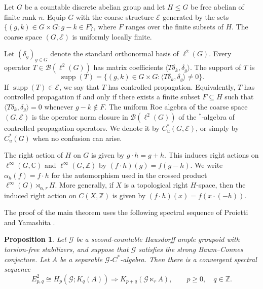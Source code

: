 \documentclass[pdflatex,sn-mathphys-num]{sn-jnl}%
\theoremstyle{plain}
\newtheorem{proposition}[theorem]{Proposition}
\theoremstyle{remark}
\theoremstyle{definition}
\numberwithin{equation}{section}
\begin{document}
Let \( G \) be a countable discrete abelian group and let \( H\leq G \) be free abelian of finite rank \( n \). Equip \( G \) with the coarse structure \( \mathcal E \) generated by the sets \( \{(g,k)\in G\times G:g-k\in F\} \), where \( F \) ranges over the finite subsets of \( H \). The coarse space \( (G,\mathcal E) \) is uniformly locally finite.

Let \( (\delta_g)_{g\in G} \) denote the standard orthonormal basis of \( \ell^2(G) \). Every operator \( T\in\mathcal B(\ell^2(G)) \) has matrix coefficients \( \langle T\delta_k,\delta_g\rangle \). The support of \( T \) is
\[
\operatorname{supp}(T)=\{(g,k)\in G\times G:\langle T\delta_k,\delta_g\rangle\neq0\}.
\]
If \( \operatorname{supp}(T)\in\mathcal E \), we say that \( T \) has controlled propagation. Equivalently, \( T \) has controlled propagation if and only if there exists a finite subset \( F\subseteq H \) such that \( \langle T\delta_k,\delta_g\rangle=0 \) whenever \( g-k\notin F \). The uniform Roe algebra of the coarse space \( (G,\mathcal E) \) is the operator norm closure in \( \mathcal B(\ell^2(G)) \) of the \( ^* \)-algebra of controlled propagation operators. We denote it by \( C_u^*(G,\mathcal E) \), or simply by \( C_u^*(G) \) when no confusion can arise.

The right action of \( H \) on \( G \) is given by \( g\cdot h=g+h \). This induces right actions on \( \ell^\infty(G,\mathbb C) \) and \( \ell^\infty(G,\mathbb Z) \) by \( (f\cdot h)(g)=f(g-h) \). We write \( \alpha_h(f)=f\cdot h \) for the automorphism used in the crossed product \( \ell^\infty(G)\rtimes_{\alpha,r}H \). More generally, if \( X \) is a topological right \( H \)-space, then the induced right action on \( C(X,\mathbb Z) \) is given by \( (f\cdot h)(x)=f(x\cdot(-h)) \).

The proof of the main theorem uses the following spectral sequence of Proietti and Yamashita \cite[Theorem~3.3]{proietti2022homology}.

\begin{proposition}
\label{prop:spectral-sequence}
Let \( \mathcal G \) be a second-countable Hausdorff ample groupoid with torsion-free stabilizers, and suppose that \( \mathcal G \) satisfies the strong Baum--Connes conjecture. Let \( A \) be a separable \( \mathcal G \)-\( C^* \)-algebra. Then there is a convergent spectral sequence
\begin{equation}
\label{eq:proietti-yamashita}
E^2_{p,q}
\cong
H_p(\mathcal G;K_q(A))
\Longrightarrow
K_{p+q}(\mathcal G\ltimes_r A),
\qquad
p\geq 0,\quad q\in\mathbb Z.
\end{equation}
\end{proposition}
\end{document}
